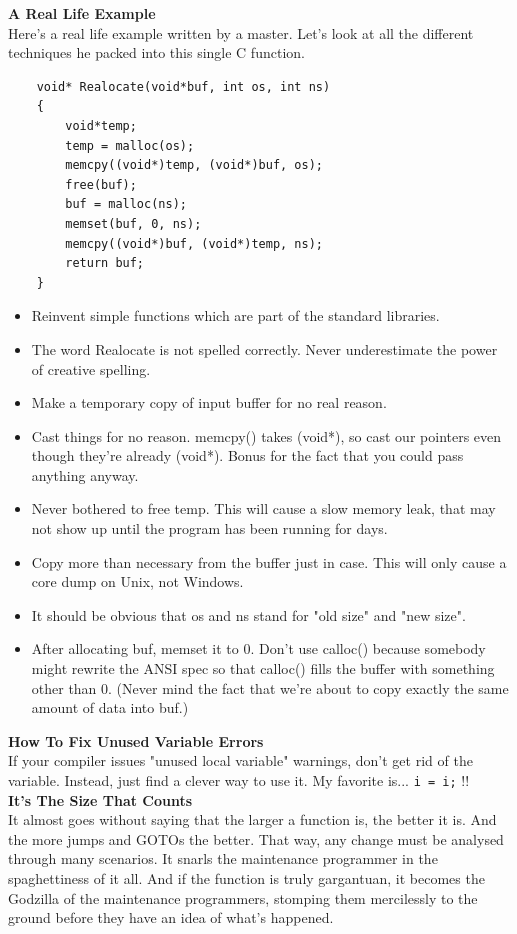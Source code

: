 \documentclass[11pt,twoside,a4paper]{article}
\begin{document}
\textbf{A Real Life Example}~\\
Here's a real life example written by a master. Let's look at all the different techniques he packed into this single C function. 
\begin{verbatim}
	void* Realocate(void*buf, int os, int ns) 
	{ 
		void*temp; 
		temp = malloc(os); 
		memcpy((void*)temp, (void*)buf, os); 
		free(buf); 
		buf = malloc(ns); 
		memset(buf, 0, ns); 
		memcpy((void*)buf, (void*)temp, ns); 
		return buf; 
	} 
\end{verbatim}
	\begin{itemize}
		\item Reinvent simple functions which are part of the standard libraries. 
		\item The word Realocate is not spelled correctly. Never underestimate the power of creative spelling. 
		\item Make a temporary copy of input buffer for no real reason. 
		\item Cast things for no reason. memcpy() takes (void*), so cast our pointers even though they're already (void*). Bonus for the fact that you could pass anything anyway. 
		\item Never bothered to free temp. This will cause a slow memory leak, that may not show up until the program has been running for days. 
		\item Copy more than necessary from the buffer just in case. This will only cause a core dump on Unix, not Windows. 
		\item It should be obvious that os and ns stand for "old size" and "new size". 
		\item After allocating buf, memset it to 0. Don't use calloc() because somebody might rewrite the ANSI spec so that calloc() fills the buffer with something other than 0. (Never mind the fact that we're about to copy exactly the same amount of data into buf.) 
	\end{itemize} %

\textbf{How To Fix Unused Variable Errors}~\\
If your compiler issues "unused local variable" warnings, don't get rid of the variable. Instead, just find a clever way to use it. My favorite is... \texttt{i = i;} !!~\\

\textbf{It's The Size That Counts}~\\
It almost goes without saying that the larger a function is, the better it is. And the more jumps and GOTOs the better. That way, any change must be analysed through many scenarios. It snarls the maintenance programmer in the spaghettiness of it all. And if the function is truly gargantuan, it becomes the Godzilla of the maintenance programmers, stomping them mercilessly to the ground before they have an idea of what's happened.~\\ 
\end{document}
